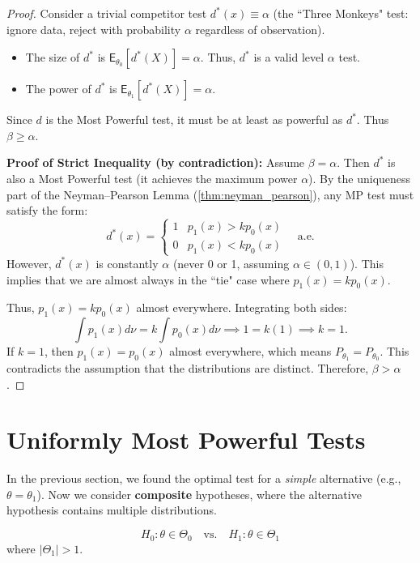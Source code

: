 \begin{proof}
Consider a trivial competitor test $d^*(x) \equiv \alpha$ (the ``Three Monkeys" test: ignore data, reject with probability $\alpha$ regardless of observation).
\begin{itemize}
    \item The size of $d^*$ is $\mathsf{E}_{\theta_0}[d^*(X)] = \alpha$. Thus, $d^*$ is a valid level $\alpha$ test.
    \item The power of $d^*$ is $\mathsf{E}_{\theta_1}[d^*(X)] = \alpha$.
\end{itemize}

Since $d$ is the Most Powerful test, it must be at least as powerful as $d^*$. Thus $\beta \ge \alpha$.

\textbf{Proof of Strict Inequality (by contradiction):}
Assume $\beta = \alpha$. Then $d^*$ is also a Most Powerful test (it achieves the maximum power $\alpha$).
By the uniqueness part of the Neyman--Pearson Lemma (\autoref{thm:neyman_pearson}), any MP test must satisfy the form:
\[ d^*(x) = \begin{cases} 1 & p_1(x) > k p_0(x) \\ 0 & p_1(x) < k p_0(x) \end{cases} \quad \text{a.e.} \]
However, $d^*(x)$ is constantly $\alpha$ (never 0 or 1, assuming $\alpha \in (0,1)$).
This implies that we are almost always in the ``tie" case where $p_1(x) = k p_0(x)$.

Thus, $p_1(x) = k p_0(x)$ almost everywhere. Integrating both sides:
\[ \int p_1(x) d\nu = k \int p_0(x) d\nu \implies 1 = k(1) \implies k=1. \]
If $k=1$, then $p_1(x) = p_0(x)$ almost everywhere, which means $P_{\theta_1} = P_{\theta_0}$. This contradicts the assumption that the distributions are distinct.
Therefore, $\beta > \alpha$.
\end{proof}

\section{Uniformly Most Powerful Tests}
\label{sec:ump_tests}

In the previous section, we found the optimal test for a \textit{simple} alternative (e.g., $\theta = \theta_1$). Now we consider \textbf{composite} hypotheses, where the alternative hypothesis contains multiple distributions.

\[ H_0: \theta \in \Theta_0 \quad \text{vs.} \quad H_1: \theta \in \Theta_1 \]
where $|\Theta_1| > 1$.

